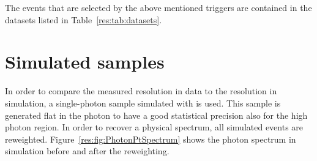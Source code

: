 The events that are selected by the above mentioned triggers are contained in the datasets listed in Table~\ref{res:tab:datasets}.
\renewcommand{\arraystretch}{1.5}
\begin{table}[!hbt]
\centering
\caption{Single-photon data samples used for the resolution measurement with the contained integrated luminosity.}
\label{res:tab:datasets}
\end{table}  

\section{Simulated samples}
\label{res:sec:SimulatedSamples}

In order to compare the measured resolution in data to the resolution in simulation, a single-photon sample simulated with \pythiaSix is used.
This sample is generated flat in the photon \pt to have a good statistical precision also for the high photon \pt region.
In order to recover a physical \pt spectrum, all simulated events are reweighted.
Figure~\ref{res:fig:PhotonPtSpectrum} shows the photon \pt spectrum in simulation before and after the reweighting. 


